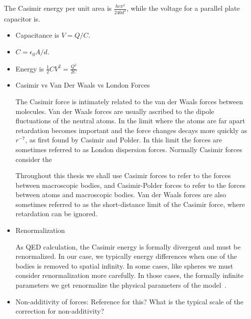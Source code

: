 \begin{itemize}
The Casimir energy per unit area is $\frac{\hbar c\pi^2}{240 d^3}$, while the voltage for a parallel plate capacitor is.
\begin{shaded}
\begin{itemize}
\item Capacitance is $V=Q/C$.  
\item $C = \epsilon_0 A/d$.  
\item Energy is $\frac{1}{2}CV^2=\frac{Q^2}{2C} $
\end{itemize}
\end{shaded}

\end{itemize}


\begin{itemize}
\item Casimir vs Van Der Waals vs London Forces

The Casimir force is intimately related to the van der Waals forces between molecules.
Van der Waals forces are usually ascribed to the dipole fluctuations of the 
neutral atoms.
In the limit where the atoms are far apart retardation becomes important and 
the force changes decays more quickly as $r^{-7}$, as first found by Casimir and Polder.  
In this limit the forces are sometimes referred to as London dispersion forces.
Normally Casimir forces consider the 

Throughout this thesis we shall use Casimir forces to refer to the forces between
macroscopic bodies, and Casimir-Polder forces to refer to the forces between 
atoms and macroscopic bodies.  Van der Waals forces are also sometimes referred to as the 
short-distance limit of the Casimir force, where retardation can be ignored.      

\item Renormalization

As QED calculation, the Casimir energy is formally divergent and must be renormalized. 
 In our case, we typically energy differences when one of the bodies is 
removed to spatial infinity.
  In some cases, like spheres we must consider renormalization more carefully.
  In those cases, the formally infinite parameters we get renormalize the 
physical parameters of the model~\cite{Milton2001}.  

\item Non-additivity of forces:  Reference for this?  What is the typical scale of the correction for non-additivity?


\end{itemize}
